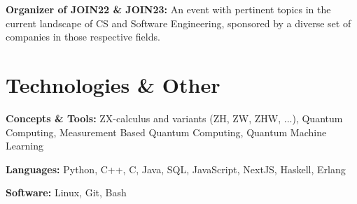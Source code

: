 \documentclass[10pt, letterpaper]{article}
\begin{document}
        \vspace{0.2 cm}

        \begin{onecolentry}
            \textbf{Organizer of JOIN22 \& JOIN23:} An event with pertinent topics in the current landscape of CS and Software Engineering, sponsored by a diverse set of companies in those respective fields.
        \end{onecolentry}
        

    \section{Technologies \& Other}

        \begin{onecolentry}
            \textbf{Concepts \& Tools:} ZX-calculus and variants (ZH, ZW, ZHW, ...), Quantum Computing, Measurement Based Quantum Computing, Quantum Machine Learning
        \end{onecolentry}

        \vspace{0.2 cm}

        \begin{onecolentry}
            \textbf{Languages:} Python, C++, C, Java, SQL, JavaScript, NextJS, Haskell, Erlang
        \end{onecolentry}

        \vspace{0.2 cm}

        \begin{onecolentry}
            \textbf{Software:} Linux, Git, Bash
        \end{onecolentry}



    
\end{document}
